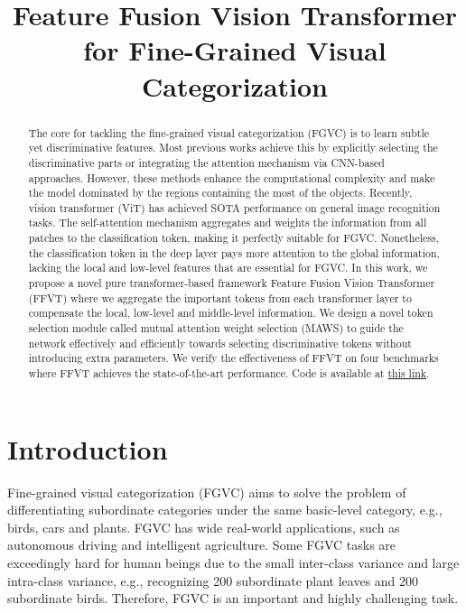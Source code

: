 \documentclass{bmvc2k}
\title{Feature Fusion Vision Transformer for Fine-Grained Visual Categorization}
\begin{document}
\maketitle

\begin{abstract}
The core for tackling the fine-grained visual categorization (FGVC) is to learn subtle yet discriminative features. Most previous works achieve this by explicitly selecting the discriminative parts or integrating the attention mechanism via CNN-based approaches. However, these methods enhance the computational complexity and make the model dominated by the regions containing the most of the objects. Recently, vision transformer (ViT) has achieved SOTA performance on general image recognition tasks. The self-attention mechanism aggregates and weights the information from all patches to the classification token, making it perfectly suitable for FGVC. Nonetheless, the classification token in the deep layer pays more attention to the global information, lacking the local and low-level features that are essential for FGVC. In this work, we propose a novel pure transformer-based framework 
Feature Fusion Vision Transformer (FFVT) where we aggregate the important tokens from each transformer layer to compensate the local, low-level and middle-level information. We design a novel token selection module called mutual attention weight selection (MAWS) to guide the network effectively and efficiently towards selecting discriminative tokens without introducing extra parameters. We verify the effectiveness of FFVT on four benchmarks where FFVT achieves the state-of-the-art performance. Code is available at \href{https://github.com/Markin-Wang/FFVT}{this link}.
\end{abstract}

\section{Introduction}
\label{sec:intro}
Fine-grained visual categorization (FGVC) aims to solve the problem of differentiating subordinate categories under the same basic-level category, e.g., birds, cars and plants. FGVC has wide real-world applications, such as autonomous driving and intelligent agriculture. Some FGVC tasks are exceedingly hard for human beings due to the small inter-class variance and large intra-class variance, e.g., recognizing 200 subordinate plant leaves and 200 subordinate birds. Therefore, FGVC is an important and highly challenging task.
\par
\end{document}
